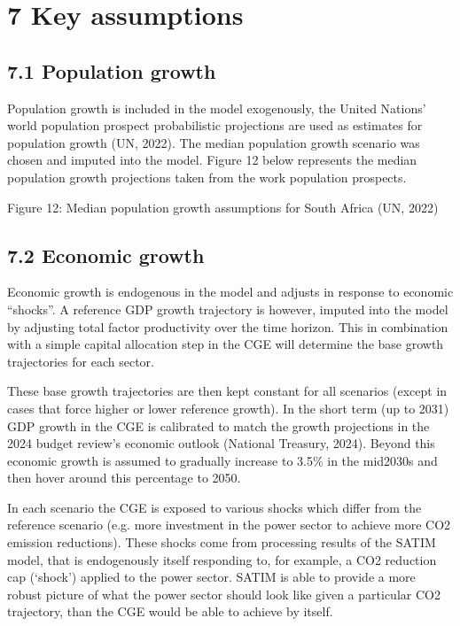\documentclass[letterpaper,10pt,english]{jupyterBook}
\begin{document}
\sphinxstepscope


\chapter{7 Key assumptions}
\label{\detokenize{07Keyassumptions:key-assumptions}}\label{\detokenize{07Keyassumptions::doc}}

\section{7.1 Population growth}
\label{\detokenize{07Keyassumptions:population-growth}}
\sphinxAtStartPar
Population growth is included in the model exogenously, the United Nations’ world population prospect probabilistic projections are used as estimates for population growth (UN, 2022). The median population growth scenario was chosen and imputed into the model. Figure 12 below represents the median population growth projections taken from the work population prospects.

\sphinxAtStartPar
Figure 12: Median population growth assumptions for South Africa (UN, 2022)


\section{7.2 Economic growth}
\label{\detokenize{07Keyassumptions:economic-growth}}
\sphinxAtStartPar
Economic growth is endogenous in the model and adjusts in response to economic “shocks”. A reference GDP growth trajectory is however, imputed into the model by adjusting total factor productivity over the time horizon. This in combination with a simple capital allocation step in the CGE will determine the base growth trajectories for each sector.

\sphinxAtStartPar
These base growth trajectories are then kept constant for all scenarios (except in cases that force higher or lower reference growth). In the short term (up to 2031) GDP growth in the CGE is calibrated to match the growth projections in the 2024 budget review’s economic outlook (National Treasury, 2024). Beyond this economic growth is assumed to gradually increase to 3.5\% in the mid\sphinxhyphen{}2030s and then hover around this percentage to 2050.

\sphinxAtStartPar
In each scenario the CGE is exposed to various shocks which differ from the reference scenario (e.g. more investment in the power sector to achieve more CO2 emission reductions). These shocks come from processing results of the SATIM model, that is endogenously itself responding to, for example, a CO2 reduction cap (‘shock’) applied to the power sector. SATIM is able to provide a more robust picture of what the power sector should look like given a particular CO2 trajectory, than the CGE would be able to achieve by itself.
\end{document}
